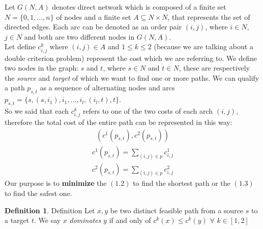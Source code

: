 \documentclass[a4paper,12pt]{report}
\begin{document}
Let $G(N,A)$ denotes direct network which is composed of a finite set $N=\{0,1, \dots, n\}$ of nodes and a finite set $A \subseteq N\times N $, that represents the set of directed edges. Each arc can be denoted as an order pair $(i,j)$, where $i\in N$, $j \in N$ and both are two different nodes in $G(N,A)$.\\
Let define $c^k_{i,j}$ where $(i,j)\in A$ and $1\leq k \leq 2$ (because we are talking about a double criterion problem) represent the cost which we are referring to. We define two nodes in the graph: $s$ and $t$, where $s \in N$ and $t \in N$, these are respectively the \textit{source} and \textit{target} of which we want to find one or more paths.
We can qualify a path $p_{s,t}$ as a sequence  of  alternating nodes and arcs $p_{s,t} = \{s, (s, i_1), i_1, \dots, i_{l}, (i_l,t), t\}$.\\
So we said that each $c^k_{i,j}$ refers to one of the two costs of each arch $(i,j)$, therefore the total cost of the entire path can be represented in this way:\\

\begin{gather}(c^1(p_{s,t}), c^2(p_{s,t}))\end{gather}
\begin{gather}c^1(p_{s,t})=\sum_{(i,j)\in p}c^1_{i,j}\end{gather}
\begin{gather}c^2(p_{s,t})=\sum_{(i,j)\in p}c^2_{i,j}\end{gather}
Our purpose is to \textbf{minimize} the $(1.2)$ to find the shortest path or the $(1.3)$ to find the safest one.
\theoremstyle{definition}
\newtheorem{definition}{Definition}
\begin{definition}{Definition}
	Let $x, y$ be two distinct feasible path from a source $s$ to a target $t$. We say $x$ \emph{dominates} $y$ if and only of $c^k(x) \leq c^k(y)$ $\forall$ $k \in [1,2]$
\end{definition}
\end{document}
